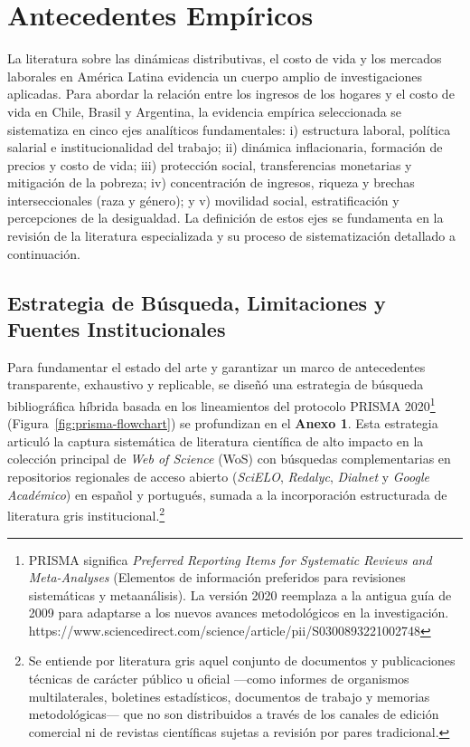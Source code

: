 \section{Antecedentes Empíricos}

La literatura sobre las dinámicas distributivas, el costo de vida y los mercados laborales en América Latina evidencia un cuerpo amplio de investigaciones aplicadas. Para abordar la relación entre los ingresos de los hogares y el costo de vida en Chile, Brasil y Argentina, la evidencia empírica seleccionada se sistematiza en cinco ejes analíticos fundamentales: i) estructura laboral, política salarial e institucionalidad del trabajo; ii) dinámica inflacionaria, formación de precios y costo de vida; iii) protección social, transferencias monetarias y mitigación de la pobreza; iv) concentración de ingresos, riqueza y brechas interseccionales (raza y género); y v) movilidad social, estratificación y percepciones de la desigualdad. La definición de estos ejes se fundamenta en la revisión de la literatura especializada y su proceso de sistematización detallado a continuación.

\subsection{Estrategia de Búsqueda, Limitaciones y Fuentes Institucionales}

Para fundamentar el estado del arte y garantizar un marco de antecedentes transparente, exhaustivo y replicable, se diseñó una estrategia de búsqueda bibliográfica híbrida basada en los lineamientos del protocolo PRISMA 2020\footnote[2]{PRISMA significa \textit{Preferred Reporting Items for Systematic Reviews and Meta-Analyses} (Elementos de información preferidos para revisiones sistemáticas y metaanálisis). La versión 2020 reemplaza a la antigua guía de 2009 para adaptarse a los nuevos avances metodológicos en la investigación. https://www.sciencedirect.com/science/article/pii/S0300893221002748} (Figura~\ref{fig:prisma-flowchart}) se profundizan en el \textbf{Anexo 1}. Esta estrategia articuló la captura sistemática de literatura científica de alto impacto en la colección principal de \textit{Web of Science} (WoS) con búsquedas complementarias en repositorios regionales de acceso abierto (\textit{SciELO}, \textit{Redalyc}, \textit{Dialnet} y \textit{Google Académico}) en español y portugués, sumada a la incorporación estructurada de literatura gris institucional.\footnote{Se entiende por literatura gris aquel conjunto de documentos y publicaciones técnicas de carácter público u oficial —como informes de organismos multilaterales, boletines estadísticos, documentos de trabajo y memorias metodológicas— que no son distribuidos a través de los canales de edición comercial ni de revistas científicas sujetas a revisión por pares tradicional.}


